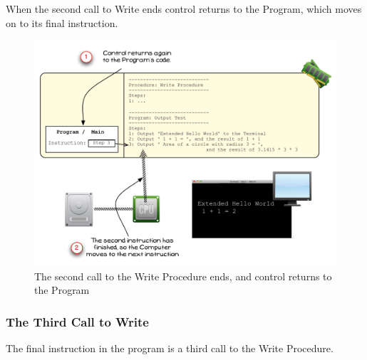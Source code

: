 When the second call to Write ends control returns to the Program, which moves on to its final instruction.

\begin{figure}[htbp]
   \centering
   \includegraphics[width=\textwidth]{./topics/program-creation/images/ProgramExecution08} 
   \caption{The second call to the Write Procedure ends, and control returns to the Program}
   \label{fig:program-creation-visualise-helloworld-8}
\end{figure}


\clearpage
\subsubsection{The Third Call to Write} %
\label{ssub:third_call_to_write}

The final instruction in the program is a third call to the Write Procedure. 

